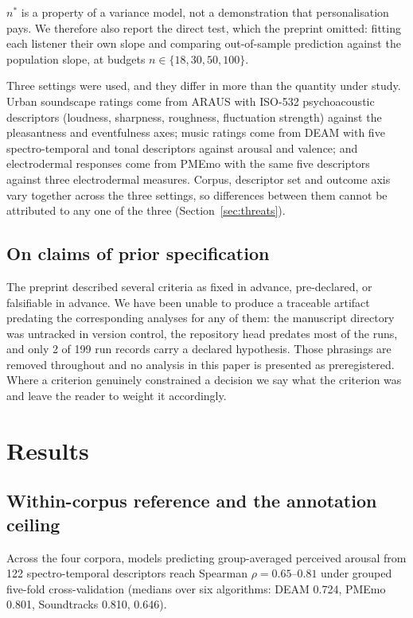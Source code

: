 $n^{*}$ is a property of a variance model, not a demonstration that
personalisation pays. We therefore also report the direct test, which the
preprint omitted: fitting each listener their own slope and comparing
out-of-sample prediction against the population slope, at budgets
$n \in \{18, 30, 50, 100\}$.

Three settings were used, and they differ in more than the quantity under
study. Urban soundscape ratings come from ARAUS
\cite{ooi2024araus, ooi2025corrigendum} with
ISO-532 psychoacoustic descriptors (loudness, sharpness, roughness,
fluctuation strength) against the pleasantness and eventfulness axes; music
ratings come from DEAM with five spectro-temporal and tonal descriptors
against arousal and valence; and electrodermal responses come from PMEmo with
the same five descriptors against three electrodermal measures. Corpus,
descriptor set and outcome axis vary together across the three settings, so
differences between them cannot be attributed to any one of the three
(Section~\ref{sec:threats}).

\subsection{On claims of prior specification}

The preprint described several criteria as fixed in advance, pre-declared, or
falsifiable in advance. We have been unable to produce a traceable artifact
predating the corresponding analyses for any of them: the manuscript directory
was untracked in version control, the repository head predates most of the
runs, and only 2 of 199 run records carry a declared hypothesis. Those
phrasings are removed throughout and no analysis in this paper is presented as
preregistered. Where a criterion genuinely constrained a decision we say what
the criterion was and leave the reader to weight it accordingly.

\section{Results}

\subsection{Within-corpus reference and the annotation ceiling}

Across the four corpora, models predicting group-averaged perceived arousal
from 122 spectro-temporal descriptors reach Spearman $\rho = 0.65$--$0.81$
under grouped five-fold cross-validation (medians over six algorithms: DEAM
0.724, PMEmo 0.801, Soundtracks 0.810, \emoOrig{} 0.646).

